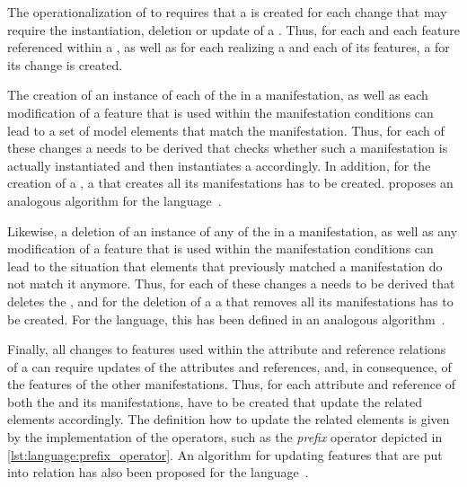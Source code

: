 The operationalization of \commonalities to \reactions requires that a \reaction is created for each change that may require the instantiation, deletion or update of a \commonality.
Thus, for each \metaclass and each feature referenced within a \commonality, as well as for each \metaclass realizing a \commonality and each of its features, a \reaction for its change is created.

The creation of an instance of each of the \metaclasses in a manifestation, as well as each modification of a feature that is used within the manifestation conditions can lead to a set of model elements that match the manifestation.
Thus, for each of these changes a \reaction needs to be derived that checks whether such a manifestation is actually instantiated and then instantiates a \commonality accordingly.
In addition, for the creation of a \commonality, a \reaction that creates all its manifestations has to be created.
\citeauthor{kramer2017a} proposes an analogous algorithm for the \mappings language~\cite[Alg.~1]{kramer2017a}.

Likewise, a deletion of an instance of any of the \metaclasses in a manifestation, as well as any modification of a feature that is used within the manifestation conditions can lead to the situation that elements that previously matched a manifestation do not match it anymore.
Thus, for each of these changes a \reaction needs to be derived that deletes the \commonality, and for the deletion of a \commonality a \reaction that removes all its manifestations has to be created.
For the \mappings language, this has been defined in an analogous algorithm~\cite[Alg.~2]{kramer2017a}.

Finally, all changes to features used within the attribute and reference relations of a \commonality can require updates of the \commonality attributes and references, and, in consequence, of the features of the other manifestations.
Thus, for each attribute and reference of both the \commonality and its manifestations, \reactions have to be created that update the related elements accordingly.
The definition how to update the related elements is given by the implementation of the operators, such as the \emph{prefix} operator depicted in \autoref{lst:language:prefix_operator}.
An algorithm for updating features that are put into relation has also been proposed for the \mappings language~\cite[Alg.~3]{kramer2017a}.

